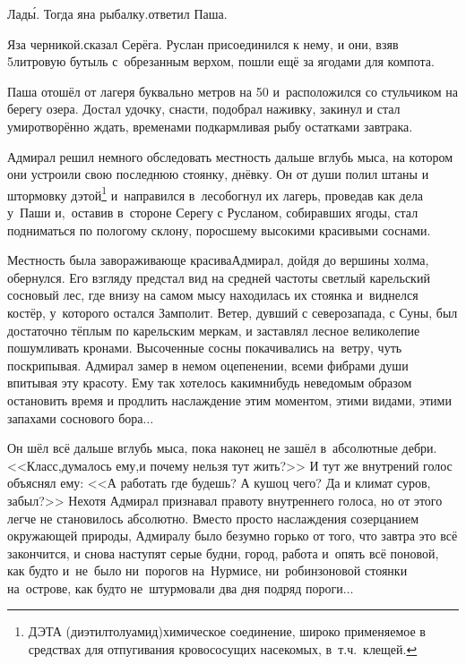 \diagdash Лад\'{ы}. Тогда я\mdash на рыбалку.\mdash ответил Паша.

\diagdash Я\mdash за черникой.\mdash сказал Серёга. Руслан присоединился к нему, и они, взяв 5\sdash литровую бутыль с~обрезанным верхом, пошли ещё за ягодами для компота.

Паша отошёл от лагеря буквально метров на 50 и~расположился со стульчиком на берегу озера. Достал удочку, снасти, подобрал наживку, закинул и стал умиротворённо ждать, временами подкармливая рыбу остатками завтрака. %

Адмирал решил немного обследовать местность дальше вглубь мыса, на котором они устроили свою последнюю стоянку, днёвку. Он от души полил штаны и штормовку дэтой\footnote{ДЭТА (диэтилтолуамид)\mdash химическое соединение, широко применяемое в средствах для отпугивания кровососущих насекомых, в~т.ч.~клещей.} и~направился в~лес\mdash обогнул их лагерь, проведав как дела у~Паши и,~оставив в~стороне Серегу с Русланом, собиравших ягоды, стал подниматься по пологому склону, поросшему высокими красивыми соснами. 

Местность была завораживающе красива\mdash Адмирал, дойдя до вершины холма, обернулся. Его взгляду предстал вид на средней частоты светлый карельский сосновый лес, где внизу на самом мысу находилась их стоянка и~виднелся костёр, у~которого остался Замполит. Ветер, дувший с северо\sdash запада, с Суны, был достаточно тёплым по карельским меркам, и заставлял лесное великолепие пошумливать кронами. Высоченные сосны покачивались на~ветру, чуть поскрипывая. Адмирал замер в немом оцепенении, всеми фибрами души впитывая эту красоту. Ему так хотелось каким\sdash нибудь неведомым образом остановить время и продлить наслаждение этим моментом, этими видами, этими запахами соснового бора$\ldots$ 

Он шёл всё дальше вглубь мыса, пока наконец не зашёл в~абсолютные дебри. <<Класс,\mdash думалось ему,\mdash и почему нельзя тут жить?>> И тут же внутрений голос объяснял ему: <<А работать где будешь? А кушоц чего? Да и климат суров, забыл?>> Нехотя Адмирал признавал правоту внутреннего голоса, но от этого легче не становилось абсолютно. Вместо просто наслаждения созерцанием окружающей природы, Адмиралу было безумно горько от того, что завтра это всё закончится, и снова наступят серые будни, город, работа и~опять всё по\sdash новой, как будто и~не~было ни~порогов на~Нурмисе, ни~робинзоновой стоянки на~острове, как будто не~штурмовали два дня подряд пороги$\ldots$ 

